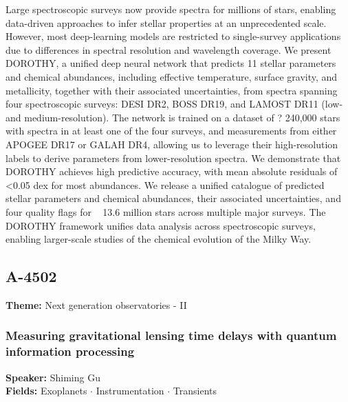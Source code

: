 Large spectroscopic surveys now provide spectra for millions of stars, enabling data-driven approaches to infer stellar properties at an unprecedented scale. However, most deep-learning models are restricted to single-survey applications due to differences in spectral resolution and wavelength coverage. We present DOROTHY, a unified deep neural network that predicts 11 stellar parameters and chemical abundances, including effective temperature, surface gravity, and metallicity, together with their associated uncertainties, from spectra spanning four spectroscopic surveys: DESI DR2, BOSS DR19, and LAMOST DR11 (low- and medium-resolution). The network is trained on a dataset of ? 240,000 stars with spectra in at least one of the four surveys, and measurements from either APOGEE DR17 or GALAH DR4, allowing us to leverage their high-resolution labels to derive parameters from lower-resolution spectra. We demonstrate that DOROTHY achieves high predictive accuracy, with mean absolute residuals of <0.05 dex for most abundances. We release a unified catalogue of predicted stellar parameters and chemical abundances, their associated uncertainties, and four quality flags for ~ 13.6 million stars across multiple major surveys. The DOROTHY framework unifies data analysis across spectroscopic surveys, enabling larger-scale studies of the chemical evolution of the Milky Way.

\subsection*{A-4502}
\textbf{Theme:} Next generation observatories - II

\hypertarget{abstract-talk-49}{}\label{abstract-page-talk-49}
\subsubsection*{Measuring gravitational lensing time delays with quantum information processing}
\textbf{Speaker:} Shiming Gu\\
\textbf{Fields:} Exoplanets $\cdot$ Instrumentation $\cdot$ Transients

